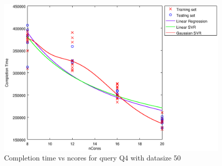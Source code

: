 
\begin {figure}[hbtp]
\centering
\includegraphics[width=\textwidth]{output/Q4_50_ONLY_1_OVER_NCORES/plot_Q4_50_bestmodels.eps}
\caption{Completion time vs ncores for query Q4 with datasize 50}
\label{fig:all_linear_Q4_50}
\end {figure}
